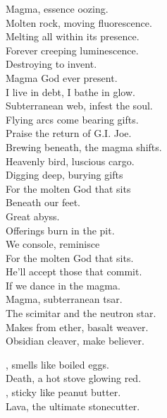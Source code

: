 Magma, essence oozing. \\
Molten rock, moving fluorescence. \\
Melting all within its presence. \\
Forever creeping luminescence. \\
Destroying to invent. \\
Magma God ever present. \\

I live in debt, I bathe in glow. \\
Subterranean web, infest the soul. \\
Flying arcs come bearing gifts. \\
Praise the return of G.I. Joe. \\

Brewing beneath, the magma shifts. \\
Heavenly bird, luscious cargo. \\
Digging deep, burying gifts \\
For the molten God that sits \\
Beneath our feet. \\

Great abyss. \\
Offerings burn in the pit. \\
We console, reminisce \\
For the molten God that sits. \\
He'll accept those that commit. \\
If we dance in the magma. \\

Magma, subterranean tsar. \\
The scimitar and the neutron star. \\
Makes from ether, basalt weaver. \\
Obsidian cleaver, make believer. \\





, smells like boiled eggs. \\
Death, a hot stove glowing red. \\
, sticky like peanut butter. \\
Lava, the ultimate stonecutter. \\

